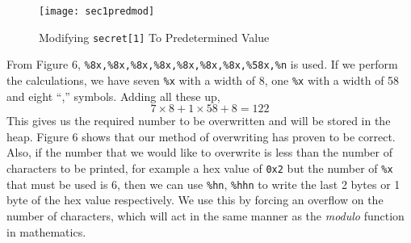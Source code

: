 \documentclass[a4paper,12pt]{article}
\begin{document}
\begin{figure}[H]
	\centering
	\texttt{[image: sec1predmod]}
	\caption{Modifying \texttt{secret[1]} To Predetermined Value}
	\label{fig:sec1predmod}
\end{figure}
\noindent From Figure 6, \texttt{\%8x,\%8x,\%8x,\%8x,\%8x,\%8x,\%8x,\%58x,\%n} is used. If we perform the calculations, we have seven \texttt{\%x} with a width of 8, one \texttt{\%x} with a width of 58 and eight ``,'' symbols. Adding all these up,
$$7\times 8+1\times 58+8=122$$
This gives us the required number to be overwritten and will be stored in the heap. Figure 6 shows that our method of overwriting has proven to be correct. Also, if the number that we would like to overwrite is less than the number of characters to be printed, for example a hex value of \texttt{0x2} but the number of \texttt{\%x} that must be used is 6, then we can use \texttt{\%hn}, \texttt{\%hhn} to write the last 2 bytes or 1 byte of the hex value respectively. We use this by forcing an overflow on the number of characters, which will act in the same manner as the \textit{modulo} function in mathematics.
\end{document}
